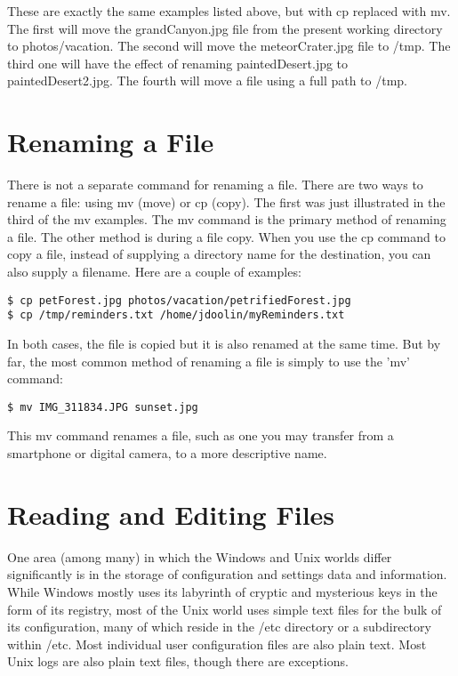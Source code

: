 These are exactly the same examples listed above, but with cp replaced with mv.  The first will move the grandCanyon.jpg file from the present working directory to photos/vacation.  The second will move the meteorCrater.jpg file to /tmp.  The third one will have the effect of renaming paintedDesert.jpg to paintedDesert2.jpg.  The fourth will move a file using a full path to /tmp.\\

\section{Renaming a File}

There is not a separate command for renaming a file.  There are two ways to rename a file: using mv (move) or cp (copy).  The first was just illustrated in the third of the mv examples.  The mv command is the primary method of renaming a file.  The other method is during a file copy.  When you use the cp command to copy a file, instead of supplying a directory name for the destination, you can also supply a filename.  Here are a couple of examples:

\begin{verbatim}
$ cp petForest.jpg photos/vacation/petrifiedForest.jpg
$ cp /tmp/reminders.txt /home/jdoolin/myReminders.txt
\end{verbatim}

In both cases, the file is copied but it is also renamed at the same time.  But by far, the most common method of renaming a file is simply to use the 'mv' command:

\begin{verbatim}
$ mv IMG_311834.JPG sunset.jpg
\end{verbatim}

This mv command renames a file, such as one you may transfer from a smartphone or digital camera, to a more descriptive name.

\section{Reading and Editing Files}

One area (among many) in which the Windows and Unix worlds differ significantly is in the storage of configuration and settings data and information.  While Windows mostly uses its labyrinth of cryptic and mysterious keys in the form of its registry, most of the Unix world uses simple text files for the bulk of its configuration, many of which reside in the /etc directory or a subdirectory within /etc.  Most individual user configuration files are also plain text. Most Unix logs are also plain text files, though there are exceptions.\\

